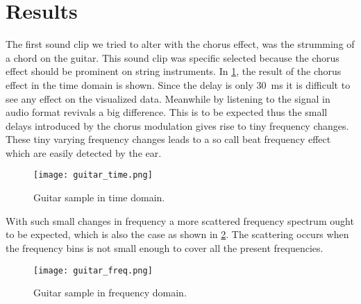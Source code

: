 

\section{Results}
The first sound clip we tried to alter with the chorus effect, was the strumming of a chord on the guitar. This sound clip was specific selected because the chorus effect should be prominent on string instruments. 
In \cref{fig:guitar_time}, the result of the chorus effect in the time domain is shown. Since the delay is only \SI{30}{\milli\second} it is difficult to see any effect on the visualized data. Meanwhile by listening to the signal in audio format revivals a big difference. This is to be expected thus the small delays introduced by the chorus modulation gives rise to tiny frequency changes. These tiny varying frequency changes leads to a so call beat frequency effect which are easily detected by the ear.

\begin{figure}[H]
	\centering
	\texttt{[image: guitar\_time.png]}
	\caption{Guitar sample in time domain.}
	\label{fig:guitar_time}
\end{figure}



With such small changes in frequency a more scattered frequency spectrum ought to be expected, which is also the case as shown in \cref{fig:guitar_freq}. The scattering occurs when the frequency bins is not small enough to cover all the present frequencies.
   
\begin{figure}[H]
	\centering
	\texttt{[image: guitar\_freq.png]}
	\caption{Guitar sample in frequency domain.}
	\label{fig:guitar_freq}
\end{figure}






